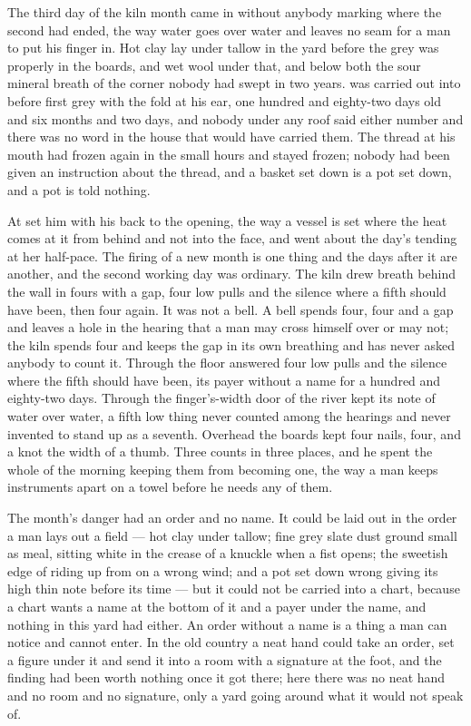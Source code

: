 
The third day of the kiln month came in without anybody marking where the second had ended, the way water goes over water and leaves no seam for a man to put his finger in. Hot clay lay under tallow in the yard before the grey was properly in the boards, and wet wool under that, and below both the sour mineral breath of the corner nobody had swept in two years.  was carried out into  before first grey with the fold at his ear, one hundred and eighty-two days old and six months and two days, and nobody under any roof said either number and there was no word in the house that would have carried them. The thread at his mouth had frozen again in the small hours and stayed frozen; nobody had been given an instruction about the thread, and a basket set down is a pot set down, and a pot is told nothing.

At   set him with his back to the opening, the way a vessel is set where the heat comes at it from behind and not into the face, and went about the day's tending at her half-pace. The firing of a new month is one thing and the days after it are another, and the second working day was ordinary. The kiln drew breath behind the wall in fours with a gap, four low pulls and the silence where a fifth should have been, then four again. It was not a bell. A bell spends four, four and a gap and leaves a hole in the hearing that a man may cross himself over or may not; the kiln spends four and keeps the gap in its own breathing and has never asked anybody to count it. Through the floor  answered four low pulls and the silence where the fifth should have been, its payer without a name for a hundred and eighty-two days. Through the finger's-width door of  the river kept its note of water over water, a fifth low thing never counted among the hearings and never invented to stand up as a seventh. Overhead the boards kept four nails, four, and a knot the width of a thumb. Three counts in three places, and he spent the whole of the morning keeping them from becoming one, the way a man keeps instruments apart on a towel before he needs any of them.

The month's danger had an order and no name. It could be laid out in the order a man lays out a field --- hot clay under tallow; fine grey slate dust ground small as meal, sitting white in the crease of a knuckle when a fist opens; the sweetish edge of  riding up from  on a wrong wind; and a pot set down wrong giving its high thin note before its time --- but it could not be carried into a chart, because a chart wants a name at the bottom of it and a payer under the name, and nothing in this yard had either. An order without a name is a thing a man can notice and cannot enter. In the old country a neat hand could take an order, set a figure under it and send it into a room with a signature at the foot, and the finding had been worth nothing once it got there; here there was no neat hand and no room and no signature, only a yard going around what it would not speak of.

